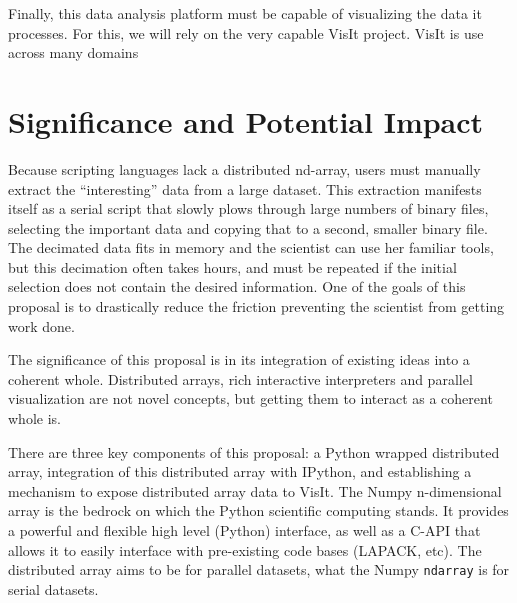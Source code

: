 \documentclass[letterpaper,12pt]{article}
\begin{document}
Finally, this data analysis platform must be capable of visualizing the data it processes.  For this, we will rely on the very capable VisIt project.  VisIt is use across many domains






\section*{Significance and Potential Impact}

Because scripting languages lack a distributed nd-array, users must manually extract the ``interesting'' data from a large dataset.  This extraction manifests itself as a serial script that slowly plows through large numbers of binary files, selecting the important data and copying that to a second, smaller binary file.  The decimated data fits in memory and the scientist can use her familiar tools, but this decimation often takes hours, and must be repeated if the initial selection does not contain the desired information.  One of the goals of this proposal is to drastically reduce the friction preventing the scientist from getting work done.


The significance of this proposal is in its integration of existing ideas into a coherent whole.  Distributed arrays, rich interactive interpreters and parallel visualization are not novel concepts, but getting them to interact as a coherent whole is.

There are three key components of this proposal: a Python wrapped distributed array, integration of this distributed array with IPython, and establishing a mechanism to expose distributed array data to VisIt.  The Numpy n-dimensional array is the bedrock on which the Python scientific computing stands.  It provides a powerful and flexible high level (Python) interface, as well as a C-API that allows it to easily interface with pre-existing code bases (LAPACK, etc).  The distributed array aims to be for parallel datasets, what the Numpy \texttt{ndarray} is for serial datasets.
\end{document}
